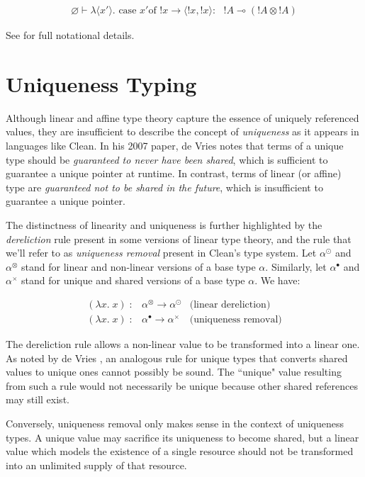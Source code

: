 \documentclass[]{unswthesis}
\newcommand{\case}{\text{ case }}
\newcommand{\of}{\text{of }}
\newcommand{\yields}{\multimap}
\begin{document}
\begin{eqnarray*}
\varnothing \vdash \lambda \langle x' \rangle . \case x' \of !x \rightarrow \langle !x, !x\rangle :\text{ } !A \yields (!A \otimes !A)
\end{eqnarray*}

See \cite{wadler93} for full notational details.

\section{Uniqueness Typing}

Although linear and affine type theory capture the essence of uniquely referenced values, they are insufficient to describe the concept of \textit{uniqueness} as it appears in languages like Clean. In his 2007 paper, de Vries \cite{deVries07} notes that terms of a unique type should be \textit{guaranteed to never have been shared}, which is sufficient to guarantee a unique pointer at runtime. In contrast, terms of linear (or affine) type are \textit{guaranteed not to be shared in the future}, which is insufficient to guarantee a unique pointer.

The distinctness of linearity and uniqueness is further highlighted by the \textit{dereliction} rule present in some versions of linear type theory, and the rule that we'll refer to as \textit{uniqueness removal} present in Clean's type system. Let $\alpha^\odot$ and $\alpha^\otimes$ stand for linear and non-linear versions of a base type $\alpha$. Similarly, let $\alpha^\bullet$ and $\alpha^\times$ stand for unique and shared versions of a base type $\alpha$. We have:

\begin{eqnarray*}
(\lambda x. \; x) \; : & \alpha^\otimes \rightarrow \alpha^\odot & \text{(linear dereliction)}\\
(\lambda x. \; x) \; : & \alpha^\bullet \rightarrow \alpha^\times & \text{(uniqueness removal)}
\end{eqnarray*}

The dereliction rule allows a non-linear value to be transformed into a linear one. As noted by de Vries \cite{deVriesPhD08}, an analogous rule for unique types that converts shared values to unique ones cannot possibly be sound. The ``unique" value resulting from such a rule would not necessarily be unique because other shared references may still exist.

Conversely, uniqueness removal only makes sense in the context of uniqueness types. A unique value may sacrifice its uniqueness to become shared, but a linear value which models the existence of a single resource should not be transformed into an unlimited supply of that resource.
\end{document}
